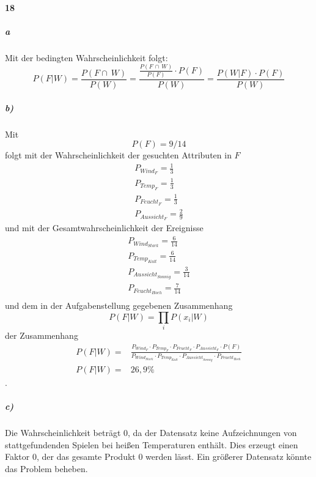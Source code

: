 \paragraph{18}
\subparagraph{a}
Mit der bedingten Wahrscheinlichkeit folgt:
\begin{equation}
P(F|W) = \frac{P(F\cap\ W)}{P(W)} = \frac{\frac{P(F\,\cap\, W)}{P(F)}\cdot P(F)}{P(W)} = \frac{P(W|F)\cdot P(F)}{P(W)}
\end{equation}

\subparagraph{b)}
Mit
\begin{equation}
  P(F)=9/14
\end{equation}
folgt mit der Wahrscheinlichkeit der gesuchten Attributen in $F$
\begin{align}
P_{Wind_F}=\frac{1}{3} \\
P_{Temp_F}=\frac{1}{3} \\
P_{Feucht_F}=\frac{1}{3} \\
P_{Aussicht_F}=\frac{2}{9}
\end{align}
und mit der Gesamtwahrscheinlichkeit der Ereignisse
\begin{align}
  P_{Wind_{Stark}}=\frac{6}{14} \\
  P_{Temp_{Kalt}}=\frac{6}{14} \\
  P_{Aussicht_{Sonnig}}=\frac{3}{14} \\
  P_{Feucht_{Hoch}}=\frac{7}{14} \\
\end{align}
und dem in der Aufgabenstellung gegebenen Zusammenhang
\begin{equation}
  P(F| W)=\prod_{i} P(x_i | W)
\end{equation} der Zusammenhang
\begin{align}
  P(F | W) =& \frac{P_{Wind_F} \cdot P_{Temp_F} \cdot P_{Feucht_F} \cdot P_{Aussicht_F}\cdot P(F)}{P_{Wind_{Stark}} \cdot P_{Temp_{Kalt}} \cdot P_{Aussicht_{Sonnig}} \cdot P_{Feucht_{Hoch}}} \\
  P(F | W) =& 26,9 \%
\end{align}
.

\subparagraph{c)}
Die Wahrscheinlichkeit beträgt 0, da der Datensatz keine Aufzeichnungen von stattgefundenden Spielen bei heißen Temperaturen enthält.
Dies erzeugt einen Faktor 0, der das gesamte Produkt 0 werden lässt.
Ein größerer Datensatz könnte das Problem beheben.
